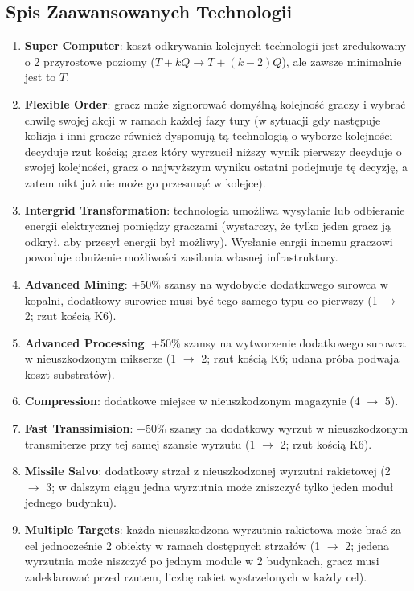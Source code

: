 \documentclass[11pt,a4paper]{article}
\begin{document}
\subsection{Spis Zaawansowanych Technologii}
\begin{enumerate}
\item \textbf{Super Computer}: koszt odkrywania kolejnych technologii jest zredukowany o 2 przyrostowe poziomy  ($T+kQ \to T+(k-2)Q$), ale zawsze minimalnie jest to $T$.
\item \textbf{Flexible Order}: gracz może zignorować domyślną kolejność graczy i wybrać chwilę swojej akcji w ramach każdej fazy tury (w sytuacji gdy następuje kolizja i inni gracze również dysponują tą technologią o wyborze kolejności decyduje rzut kością; gracz który wyrzucił niższy wynik pierwszy decyduje o swojej kolejności, gracz o najwyższym wyniku ostatni podejmuje tę decyzję, a zatem nikt już nie może go przesunąć w kolejce).
\item \textbf{Intergrid Transformation}: technologia umożliwa wysyłanie lub odbieranie energii elektrycznej pomiędzy graczami (wystarczy, że tylko jeden gracz ją odkrył, aby przesył energii był możliwy). Wysłanie enrgii innemu graczowi powoduje obniżenie możliwości zasilania własnej infrastruktury.
\item \textbf{Advanced Mining}: +50\% szansy na wydobycie dodatkowego surowca w kopalni, dodatkowy surowiec musi być tego samego typu co pierwszy (1 $\to$ 2; rzut kością K6).
\item \textbf{Advanced Processing}: +50\% szansy na wytworzenie dodatkowego surowca w nieuszkodzonym mikserze (1 $\to$ 2; rzut kością K6; udana próba podwaja koszt substratów).
\item \textbf{Compression}: dodatkowe miejsce w nieuszkodzonym magazynie (4 $\to$ 5).
\item \textbf{Fast Transsimision}: +50\% szansy na dodatkowy wyrzut w nieuszkodzonym transmiterze przy tej samej szansie wyrzutu (1 $\to$ 2; rzut kością K6).
\item \textbf{Missile Salvo}: dodatkowy strzał z nieuszkodzonej wyrzutni rakietowej (2 $\to$ 3; w dalszym ciągu jedna wyrzutnia może zniszczyć tylko jeden moduł jednego budynku).
\item \textbf{Multiple Targets}: każda nieuszkodzona wyrzutnia rakietowa może brać za cel jednocześnie 2 obiekty w ramach dostępnych strzałów (1 $\to$ 2; jedena wyrzutnia może niszczyć po jednym module w 2 budynkach, gracz musi zadeklarować przed rzutem, liczbę rakiet wystrzelonych w każdy cel).

\end{enumerate}
\end{document}

